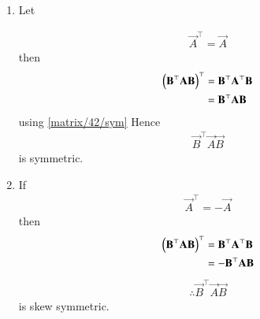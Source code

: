 \begin{enumerate}
\item Let

\begin{align}
\vec{A}^{\top}=\vec{A}
\label{matrix/42/sym}
\end{align}
then
\begin{align}
\left(\mathbf{B}^{\top}\mathbf{A}\mathbf{B}\right)^\top
&=\mathbf{B}^{\top}\mathbf{A}^{\top}\mathbf{B}\\
&=\mathbf{B}^{\top}\mathbf{A}\mathbf{B}\\
\end{align}
using \ref{matrix/42/sym}
Hence
\begin{align}
\vec{B}^{\top}\vec{A}\vec{B}
\end{align}
is symmetric. 
\item If 
\begin{align}
\vec{A}^\top=-\vec{A}
\label{matrix/42/asym}
\end{align}
then
\begin{align}
    \left(\mathbf{B}^{\top}\mathbf{A}\mathbf{B}\right)^\top
    &=\mathbf{B}^{\top}\mathbf{A}^{\top}\mathbf{B}\\
    &=-\mathbf{B}^{\top}\mathbf{A}\mathbf{B}\\
    \end{align}
    \begin{align}
\therefore \vec{B}^{\top}\vec{A}\vec{B}
\end{align}
is skew symmetric. 
\end{enumerate}